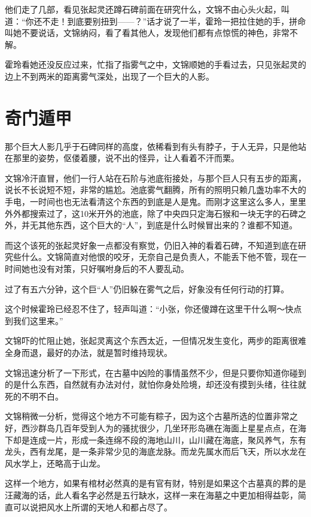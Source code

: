 他们走了几部，看见张起灵还蹲石碑前面在研究什么，文锦不由心头火起，叫道：“你还不走！到底要别扭到——？”话才说了一半，霍玲一把拉住她的手，拼命叫她不要说话，文锦纳闷，看了看其他人，发现他们都有点惊慌的神色，非常不解。

霍玲看她还没反应过来，忙指了指雾气之中，文锦顺她的手看过去，只见张起灵的边上不到两米的距离雾气深处，出现了一个巨大的人影。

\chapter{奇门遁甲}

那个巨大人影几乎于石碑同样的高度，依稀看到有头有脖子，于人无异，只是他站在那里的姿势，伛偻着腰，说不出的怪异，让人看着不汗而栗。

文锦冷汗直冒，他们一行人站在石阶与池底衔接处，与那个巨人只有五步的距离，说长不长说短不短，非常的尴尬。池底雾气翻腾，所有的照明只赖几盏功率不大的手电，一时间也也无法看清这个东西的到底是人是鬼。而刚才这里这么多人，里里外外都搜索过了，这10米开外的池底，除了中央四只定海石猴和一块无字的石碑之外，并无其他东西，这个巨大的“人”，到底是什么时候冒出来的？谁都不知道。

而这个该死的张起灵好象一点都没有察觉，仍旧入神的看着石碑，不知道到底在研究些什么。文锦简直对他恨的咬牙，无奈自己是负责人，不能丢下他不管，现在一时间她也没有对策，只好嘱咐身后的不人要乱动。

过了有五六分钟，这个巨“人”仍旧躲在雾气之后，好象没有任何行动的打算。

这个时候霍玲已经忍不住了，轻声叫道：“小张，你还傻蹲在这里干什么啊～快点到我们这里来。”

文锦吓的忙阻止她，张起灵离这个东西太近，一但情况发生变化，两步的距离很难全身而退，最好的办法，就是暂时维持现状。

文锦迅速分析了一下形式，在古墓中凶险的事情虽然不少，但是只要你知道你碰到的是什么东西，自然就有办法对付，就怕你身处险境，却还没有摸到头绪，往往就死的不明不白。

文锦稍微一分析，觉得这个地方不可能有粽子，因为这个古墓所选的位置非常之好，西沙群岛几百年受到人为的骚扰很少，几坐环形岛礁在海面上星星点点，在海下却是连成一片，形成一条连绵不段的海地山川，山川藏在海底，聚风养气，东有龙头，西有龙尾，是一条非常少见的海底龙脉。而龙先属水而后飞天，所以水龙在风水学上，还略高于山龙。

这样一个地方，如果有棺材必然真的是有官有财，特别是如果这个古墓真的葬的是汪藏海的话，此人看名字必然是五行缺水，这样一来在海墓之中更加相得益彰，简直可以说把风水上所谓的天地人和都占尽了。

